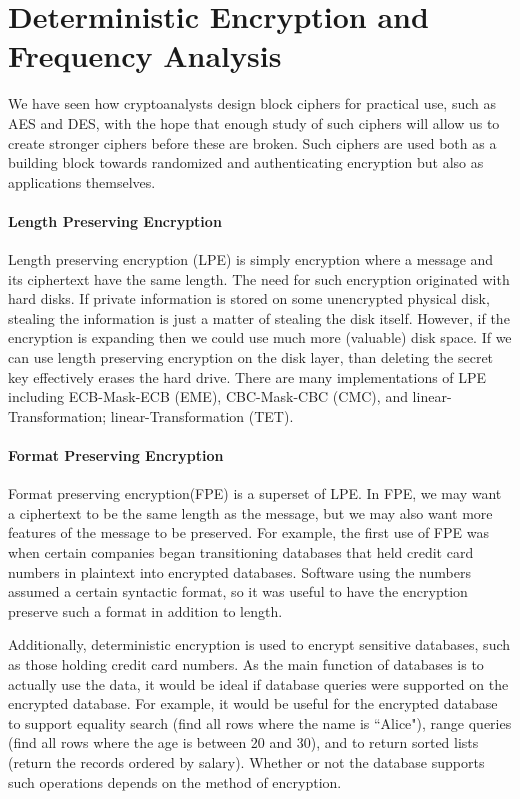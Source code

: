 \section{Deterministic Encryption and Frequency Analysis}
\label{sec:freqanalysis}

We have seen how cryptoanalysts design block ciphers for practical use, such as AES and DES, with the hope that enough study of such ciphers will allow us to create stronger ciphers before these are broken.
 Such ciphers are used both as a building block towards randomized and authenticating encryption but also as applications themselves.

\paragraph{Length Preserving Encryption} 
Length preserving encryption (LPE) is simply encryption where a message and its ciphertext have the same length. The need for such encryption originated with hard disks. If private information is stored on some unencrypted physical disk, stealing the information is just a matter of stealing the disk itself. However, if the encryption is expanding then we could use much more (valuable) disk space. If we can use length preserving encryption on the disk layer, than deleting the secret key effectively erases the hard drive. There are many implementations of LPE including ECB-Mask-ECB (EME)\cite{Halevi2004EME}, CBC-Mask-CBC (CMC)\cite{Halevi2003CMC}, and linear-Transformation; linear-Transformation (TET)\cite{Halevi2007TET}.

\paragraph{Format Preserving Encryption}
Format preserving encryption(FPE) is a superset of LPE. In FPE, we may want a ciphertext to be the same length as the message, but we may also want more features of the message to be preserved.
For example, the first use of FPE was when certain companies began transitioning databases that held credit card numbers in plaintext into encrypted databases. Software using the numbers assumed a certain syntactic format, so it was useful to have the encryption preserve such a format in addition to length.

Additionally, deterministic encryption is used to encrypt sensitive databases, such as those holding credit card numbers. As the main function of databases is to actually use the data, it would be ideal if database queries were supported on the encrypted database. For example, it would be useful for the encrypted database to support equality search (find all rows where the name is ``Alice"), range queries (find all rows where the age is between 20 and 30), and to return sorted lists (return the records ordered by salary). Whether or not the database supports such operations depends on the method of encryption. 

